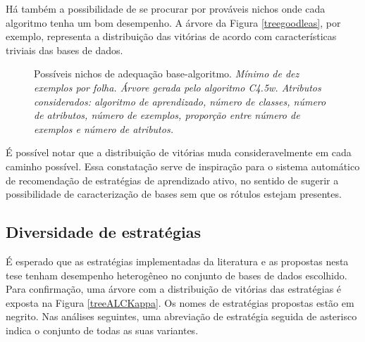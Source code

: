 \usetikzlibrary{trees}
Há também a possibilidade de se procurar por prováveis nichos onde cada algoritmo tenha
um bom desempenho.
A árvore da Figura \ref{treegoodleas}, por exemplo, representa a distribuição das vitórias
de acordo com características triviais das bases de dados.
\begin{figure}
\begin{center}
\caption{Possíveis nichos de adequação base-algoritmo.
\textit{Mínimo de dez exemplos por folha.
Árvore gerada pelo algoritmo C4.5w.
Atributos considerados: algoritmo de aprendizado,
número de classes, número de atributos, número de exemplos,
proporção entre número de exemplos e número de atributos.
}}
\begin{tikzpicture} [edge from parent/.style={->,above,draw,sloped,midway,gray!30,ultra thick},
text width=2.7cm, align=flush center, grow cyclic,
level 1/.style={level distance=3.2cm,sibling angle=45},
level 2/.style={text width=2cm, font=\footnotesize, level distance=3.2cm,sibling angle=60},
level 3/.style={text width=2cm, font=\footnotesize, level distance=3.2cm,sibling angle=60},
level 4/.style={text width=2cm, font=\footnotesize, level distance=3.2cm,sibling angle=90},
level 5/.style={text width=2cm, font=\footnotesize, level distance=3.2cm,sibling angle=45},
]

\label{treegoodleas}
\end{tikzpicture}
\end{center}
\end{figure}
É possível notar que a distribuição de vitórias muda consideravelmente em cada caminho
possível.
Essa constatação serve de inspiração para o sistema automático de recomendação
de estratégias de aprendizado ativo, no sentido de sugerir a possibilidade de caracterização
de bases sem que os rótulos estejam presentes.


\subsection{Diversidade de estratégias}
É esperado que as estratégias implementadas da literatura e as propostas nesta tese
tenham desempenho heterogêneo no conjunto de bases de dados escolhido.
Para confirmação,
uma árvore com a distribuição de vitórias das estratégias é exposta
na Figura \ref{treeALCKappa}.
Os nomes de estratégias propostas estão em negrito.
Nas análises seguintes, uma abreviação de estratégia seguida de asterisco indica o conjunto
de todas as suas variantes.
\usetikzlibrary{trees}
% 


